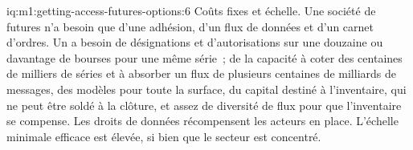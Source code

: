 \begin{solution}{iq:m1:getting-access-futures-options:6}
Coûts fixes et échelle. Une société de futures n'a besoin que d'une adhésion, d'un flux de
données et d'un carnet d'ordres. Un  a besoin de désignations et d'autorisations sur une douzaine ou
davantage de bourses pour une même série~; de la capacité à coter des centaines de milliers
de séries et à absorber un flux de plusieurs centaines de milliards de messages, des modèles
pour toute la surface, du capital destiné à l'inventaire, qui ne peut être soldé à la
clôture, et assez de diversité de flux pour que l'inventaire se compense. Les droits de données
récompensent les acteurs en place. L'échelle minimale efficace est élevée, si bien que le secteur est
concentré.
\end{solution}
